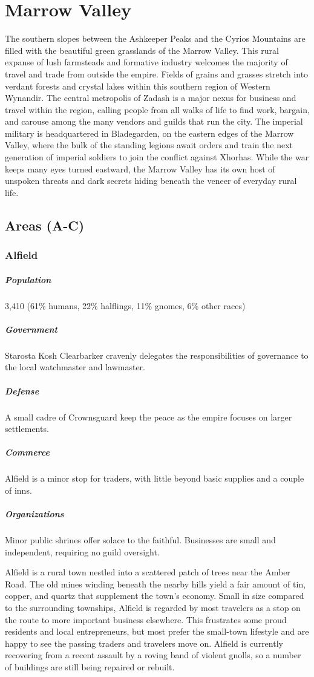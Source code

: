\documentclass[10pt,a4paper,twoside,bg=print,twocolumn,openany,nodeprecatedcode]{dndbook}
\begin{document}
\section{Marrow Valley}
The southern slopes between the Ashkeeper Peaks and the Cyrios Mountains are filled with the beautiful green grasslands of the Marrow Valley. This rural expanse of lush farmsteads and formative industry welcomes the majority of travel and trade from outside the empire. Fields of grains and grasses stretch into verdant forests and crystal lakes within this southern region of Western Wynandir. The central metropolis of Zadash is a major nexus for business and travel within the region, calling people from all walks of life to find work, bargain, and carouse among the many vendors and guilds that run the city. The imperial military is headquartered in Bladegarden, on the eastern edges of the Marrow Valley, where the bulk of the standing legions await orders and train the next generation of imperial soldiers to join the conflict against Xhorhas. While the war keeps many eyes turned eastward, the Marrow Valley has its own host of unspoken threats and dark secrets hiding beneath the veneer of everyday rural life.

\subsection{Areas (A-C)}
\subsubsection{Alfield}
\subparagraph{Population}
3,410 (61\% humans, 22\% halflings, 11\% gnomes, 6\% other races)

\subparagraph{Government}
Starosta Kosh Clearbarker cravenly delegates the responsibilities of governance to the local watchmaster and lawmaster.

\subparagraph{Defense}
A small cadre of Crownsguard keep the peace as the empire focuses on larger settlements.

\subparagraph{Commerce}
Alfield is a minor stop for traders, with little beyond basic supplies and a couple of inns.

\subparagraph{Organizations}
Minor public shrines offer solace to the faithful. Businesses are small and independent, requiring no guild oversight.

Alfield is a rural town nestled into a scattered patch of trees near the Amber Road. The old mines winding beneath the nearby hills yield a fair amount of tin, copper, and quartz that supplement the town's economy. Small in size compared to the surrounding townships, Alfield is regarded by most travelers as a stop on the route to more important business elsewhere. This frustrates some proud residents and local entrepreneurs, but most prefer the small-town lifestyle and are happy to see the passing traders and travelers move on. Alfield is currently recovering from a recent assault by a roving band of violent gnolls, so a number of buildings are still being repaired or rebuilt.
\end{document}
